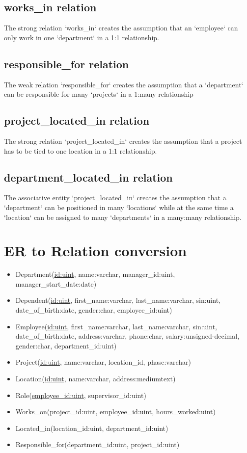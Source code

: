 \documentclass[fleqn, 11pt,letterpaper]{article}
\begin{document}
\subsection{works\_in relation}
The strong relation `works\_in` creates the assumption that an `employee` can only work in one `department` in a 1:1 relationship.
\subsection{responsible\_for relation}
	The weak relation `responsible\_for` creates the assumption that a `department` can be responsible for many `projects` in a 1:many relationship
\subsection{project\_located\_in relation}
The strong relation `project\_located\_in` creates the assumption that a project has to be tied to one location in a 1:1 relationship.
\subsection{department\_located\_in relation}
The associative entity `project\_located\_in` creates the assumption that a `department` can be positioned in many `locations` while at the same time a `location` can be assigned to many `departments` in a many:many relationship.

\pagebreak

\section{ER to Relation conversion }
\begin{itemize}[]

	\item 	Department(\uline{id:uint}, name:varchar, manager\_id:uint, manager\_start\_date:date)
	\item 	Dependent(\uline{id:uint}, first\_name:varchar, last\_name:varchar, sin:uint, date\_of\_birth:date, gender:char, employee\_id:uint)
	\item 	Employee(\uline{id:uint}, first\_name:varchar, last\_name:varchar, sin:uint, date\_of\_birth:date, address:varchar, phone:char, salary:unsigned-decimal, gender:char, department\_id:uint)
		\item Project(\uline{id:uint}, name:varchar, location\_id, phase:varchar)
		\item Location(\uline{id:uint}, name:varchar, address:mediumtext)
		\item Role(\uline{employee\_id:uint}, supervisor\_id:uint)
		\item Works\_on(project\_id:uint, employee\_id:uint, hours\_worked:uint)
	\item 	Located\_in(location\_id:uint, department\_id:uint)
	\item 	Responsible\_for(department\_id:uint, project\_id:uint)
\end{itemize}
\pagebreak
\end{document}
